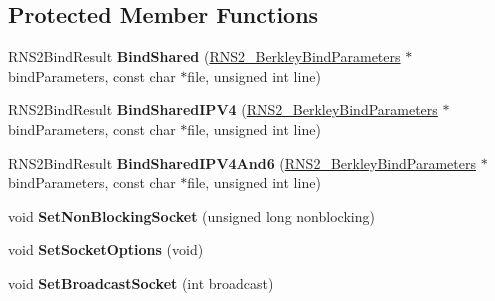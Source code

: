 \subsection*{Protected Member Functions}
\begin{DoxyCompactItemize}
\item 
\hypertarget{class_rak_net_1_1_r_n_s2___berkley_a864d0d0b615d4f5f5f0ebf31acb4baef}{R\-N\-S2\-Bind\-Result {\bfseries Bind\-Shared} (\hyperlink{struct_rak_net_1_1_r_n_s2___berkley_bind_parameters}{R\-N\-S2\-\_\-\-Berkley\-Bind\-Parameters} $\ast$bind\-Parameters, const char $\ast$file, unsigned int line)}\label{class_rak_net_1_1_r_n_s2___berkley_a864d0d0b615d4f5f5f0ebf31acb4baef}

\item 
\hypertarget{class_rak_net_1_1_r_n_s2___berkley_afbd08a1dff8ce93376121e8a5e31eb49}{R\-N\-S2\-Bind\-Result {\bfseries Bind\-Shared\-I\-P\-V4} (\hyperlink{struct_rak_net_1_1_r_n_s2___berkley_bind_parameters}{R\-N\-S2\-\_\-\-Berkley\-Bind\-Parameters} $\ast$bind\-Parameters, const char $\ast$file, unsigned int line)}\label{class_rak_net_1_1_r_n_s2___berkley_afbd08a1dff8ce93376121e8a5e31eb49}

\item 
\hypertarget{class_rak_net_1_1_r_n_s2___berkley_a18ee3a38952442276f0ca3329fe76f71}{R\-N\-S2\-Bind\-Result {\bfseries Bind\-Shared\-I\-P\-V4\-And6} (\hyperlink{struct_rak_net_1_1_r_n_s2___berkley_bind_parameters}{R\-N\-S2\-\_\-\-Berkley\-Bind\-Parameters} $\ast$bind\-Parameters, const char $\ast$file, unsigned int line)}\label{class_rak_net_1_1_r_n_s2___berkley_a18ee3a38952442276f0ca3329fe76f71}

\item 
\hypertarget{class_rak_net_1_1_r_n_s2___berkley_ac4b4e4c3c07f43a38cc38ede35fd7871}{void {\bfseries Set\-Non\-Blocking\-Socket} (unsigned long nonblocking)}\label{class_rak_net_1_1_r_n_s2___berkley_ac4b4e4c3c07f43a38cc38ede35fd7871}

\item 
\hypertarget{class_rak_net_1_1_r_n_s2___berkley_a3e6e29d792f6f25f339df929e62a1e4e}{void {\bfseries Set\-Socket\-Options} (void)}\label{class_rak_net_1_1_r_n_s2___berkley_a3e6e29d792f6f25f339df929e62a1e4e}

\item 
\hypertarget{class_rak_net_1_1_r_n_s2___berkley_a23473f9bdf5938b2fbb691b9a2fca8ce}{void {\bfseries Set\-Broadcast\-Socket} (int broadcast)}\label{class_rak_net_1_1_r_n_s2___berkley_a23473f9bdf5938b2fbb691b9a2fca8ce}


\end{DoxyCompactItemize}
